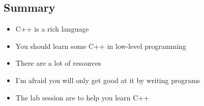 
\begin{slide}
\section{Summary}

\begin{PauseHighLight}
  \begin{itemize}
  \item C++ is a rich language\pause
  \item You should learn some C++ in low-level programming\pause
  \item There are a lot of resources\pause
  \item I'm afraid you will only get good at it by writing
    programs\pause
  \item The lab session are to help you learn C++\pause
  \end{itemize}
\end{PauseHighLight}

\end{slide}

